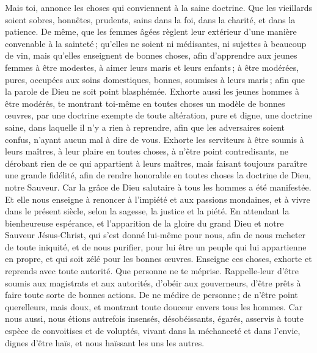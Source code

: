 \begin{multicols}{2}
\VerseOne{}Mais toi, annonce les choses qui conviennent à la saine doctrine.
Que les vieillards soient sobres, honnêtes, prudents, sains dans la foi, dans la charité, et dans la patience.
De même, que les femmes âgées règlent leur extérieur d'une manière convenable à la sainteté ; qu'elles ne soient ni médisantes, ni sujettes à beaucoup de vin, mais qu'elles enseignent de bonnes choses,
afin d’apprendre aux jeunes femmes à être modestes, à aimer leurs maris et leurs enfants ;
à être modérées, pures, occupées aux soins domestiques, bonnes, soumises à leurs maris ; afin que la parole de Dieu ne soit point blasphémée.
Exhorte aussi les jeunes hommes à être modérés,
te montrant toi-même en toutes choses un modèle de bonnes œuvres, par une doctrine exempte de toute altération, pure et digne,
une doctrine saine, dans laquelle il n’y a rien à reprendre, afin que les adversaires soient confus, n'ayant aucun mal à dire de vous.
Exhorte les serviteurs à être soumis à leurs maîtres, à leur plaire en toutes choses, à n’être point contredisants,
ne dérobant rien de ce qui appartient à leurs maîtres, mais faisant toujours paraître une grande fidélité, afin de rendre honorable en toutes choses la doctrine de Dieu, notre Sauveur.
Car la grâce de Dieu salutaire à tous les hommes a été manifestée.
Et elle nous enseigne à renoncer à l'impiété et aux passions mondaines, et à vivre dans le présent siècle, selon la sagesse, la justice et la piété.
En attendant la bienheureuse espérance, et l'apparition de la gloire du grand Dieu et notre Sauveur Jésus-Christ,
qui s'est donné lui-même pour nous, afin de nous racheter de toute iniquité, et de nous purifier, pour lui être un peuple qui lui appartienne en propre, et qui soit zélé pour les bonnes œuvres.
Enseigne ces choses, exhorte et reprends avec toute autorité. Que personne ne te méprise.
\VerseOne{}Rappelle-leur d'être soumis aux magistrats et aux autorités, d'obéir aux gouverneurs, d'être prêts à faire toute sorte de bonnes actions.
De ne médire de personne ; de n'être point querelleurs, mais doux, et montrant toute douceur envers tous les hommes.
Car nous aussi, nous étions autrefois insensés, désobéissants, égarés, asservis à toute espèce de convoitises et de voluptés, vivant dans la méchanceté et dans l’envie, dignes d’être haïs, et nous haïssant les uns les autres.

\end{multicols}

